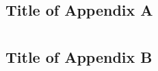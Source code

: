 \begin{appendices}
  \chapter{}\label{ch:app_1}
\section{Title of Appendix A}\label{app:app_1_A}

\chapter{}\label{ch:app_2}
\section{Title of Appendix B}\label{app:app_2_B}

\end{appendices}
